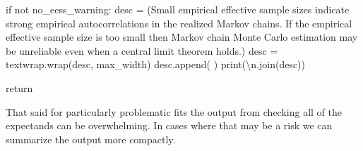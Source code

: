 \documentclass[
  letterpaper,
  DIV=11,
  numbers=noendperiod]{scrartcl}
\newenvironment{Shaded}{\begin{snugshade}}{\end{snugshade}}
\newcommand{\BuiltInTok}[1]{\textcolor[rgb]{0.00,0.23,0.31}{#1}}
\newcommand{\CharTok}[1]{\textcolor[rgb]{0.13,0.47,0.30}{#1}}
\newcommand{\ControlFlowTok}[1]{\textcolor[rgb]{0.00,0.23,0.31}{#1}}
\newcommand{\KeywordTok}[1]{\textcolor[rgb]{0.00,0.23,0.31}{#1}}
\newcommand{\NormalTok}[1]{\textcolor[rgb]{0.00,0.23,0.31}{#1}}
\newcommand{\OperatorTok}[1]{\textcolor[rgb]{0.37,0.37,0.37}{#1}}
\newcommand{\StringTok}[1]{\textcolor[rgb]{0.13,0.47,0.30}{#1}}
\begin{document}
\begin{Shaded}
\begin{Highlighting}[]
  \ControlFlowTok{if} \KeywordTok{not}\NormalTok{ no\_eess\_warning:}
\NormalTok{    desc }\OperatorTok{=}\NormalTok{ (}\StringTok{\textquotesingle{}Small empirical effective sample sizes indicate strong \textquotesingle{}}
            \StringTok{\textquotesingle{}empirical autocorrelations in the realized Markov chains. \textquotesingle{}}
            \StringTok{\textquotesingle{}If the empirical effective sample size is too \textquotesingle{}}
            \StringTok{\textquotesingle{}small then Markov chain Monte Carlo estimation \textquotesingle{}}
            \StringTok{\textquotesingle{}may be unreliable even when a central limit \textquotesingle{}}
            \StringTok{\textquotesingle{}theorem holds.\textquotesingle{}}\NormalTok{)}
\NormalTok{    desc }\OperatorTok{=}\NormalTok{ textwrap.wrap(desc, max\_width)}
\NormalTok{    desc.append(}\StringTok{\textquotesingle{} \textquotesingle{}}\NormalTok{)}
    \BuiltInTok{print}\NormalTok{(}\StringTok{\textquotesingle{}}\CharTok{\textbackslash{}n}\StringTok{\textquotesingle{}}\NormalTok{.join(desc))}
    
  \ControlFlowTok{return}
\end{Highlighting}
\end{Shaded}

That said for particularly problematic fits the output from checking all
of the expectands can be overwhelming. In cases where that may be a risk
we can summarize the output more compactly.
\end{document}
